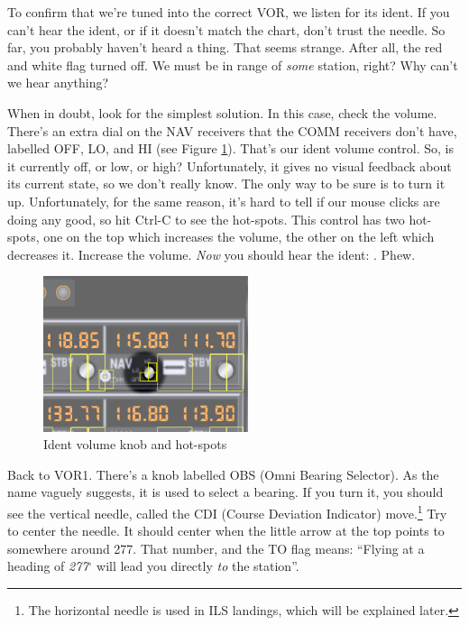 To confirm that we're tuned into the correct VOR, we listen for its
ident.  If you can't hear the ident, or if it doesn't match the chart,
don't trust the needle.  So far, you probably haven't heard a thing.
That seems strange.  After all, the red and white flag turned off.  We
must be in range of \emph{some} station, right?  Why can't we hear
anything?

When in doubt, look for the simplest solution.  In this case, check
the volume.  There's an extra dial on the NAV receivers that the COMM
receivers don't have, labelled OFF, LO, and HI (see Figure
\ref{fig:ident}).  That's our ident volume control.  So, is it
currently off, or low, or high?  Unfortunately, it gives no visual
feedback about its current state, so we don't really know.  The only
way to be sure is to turn it up.  Unfortunately, for the same reason,
it's hard to tell if our mouse clicks are doing any good, so hit
Ctrl-C to see the hot-spots.  This control has two hot-spots, one on
the top which increases the volume, the other on the left which
decreases it.  Increase the volume.  \emph{Now} you should hear the
ident: \mdot\mdot\mdot\mspace \mdot\mdash\mdash\mdash\mspace
\mdash\mdot\mdash\mdot.  Phew.


\begin{figure}
  \begin{center}
    \includegraphics[width=6cm]{img/ident_knob}
    \caption{Ident volume knob and hot-spots}
    \label{fig:ident}
  \end{center}
\end{figure}

Back to VOR1.  There's a knob labelled OBS (Omni Bearing Selector).
As the name vaguely suggests, it is used to select a bearing.  If you
turn it, you should see the vertical needle, called the CDI (Course
Deviation Indicator) move.\footnote{The horizontal needle is used in
  ILS landings, which will be explained later.}  Try to center the
needle.  It should center when the little arrow at the top points to
somewhere around 277.  That number, and the TO flag means: ``Flying at
a heading of \emph{277$^\circ$} will lead you directly \emph{to} the
station''.

